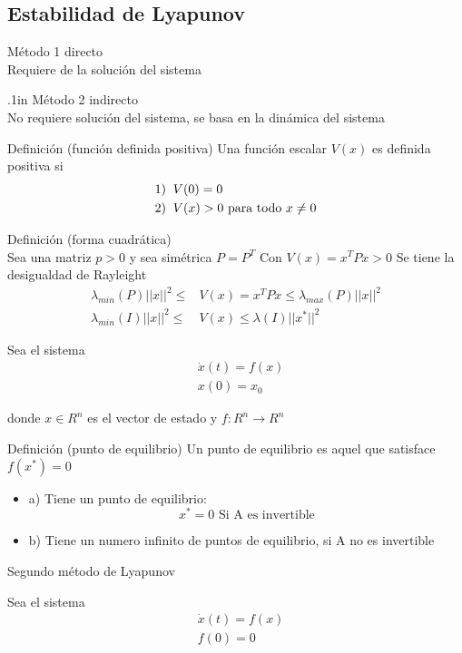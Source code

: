 \subsection{Estabilidad de Lyapunov}

Método 1 directo \\
Requiere de la solución del sistema

\parskip .1in
Método 2 indirecto \\
No requiere solución del sistema, se basa en la dinámica del sistema

Definición (función definida positiva)
Una función escalar \( V(x) \) es definida positiva si
\[
    \begin{split}
        1) & \;\; V(0) = 0 \\
        2) & \;\; V(x) > 0 \text{  para todo \( x \not = 0 \)}
    \end{split}
\]

Definición (forma cuadrática) \\
Sea una matriz \( p > 0 \) y sea simétrica \( P = P^{T} \)
Con \( V(x) = x^{T}Px > 0 \)
Se tiene la desigualdad de Rayleight
\[
    \begin{split}
        \lambda_{min}(P) ||x||^{2} \leq & V(x) = x^{T}Px \leq \lambda_{max} (P) ||x||^{2} \\
        \lambda_{min}(I)||x||^{2} \leq & V(x) \leq \lambda(I) ||x^{*}||^{2}
    \end{split}
\]

Sea el sistema
\[
    \begin{split}
        & \dot{x}(t) = f(x) \\
        & x(0) = x_{0}
    \end{split}
\]

donde \( x \in R^{n} \) es el vector de estado y \( f: R^{n} \to R^{n}\)

Definición  (punto de equilibrio)
Un punto de equilibrio es aquel que satisface \( f(x^{*}) = 0 \)
\begin{itemize}
    \item a) Tiene un punto de equilibrio: 
    \[
        x^{*} = 0 \text{  Si A es invertible}
    \]
    \item b) Tiene un numero infinito de puntos de equilibrio, si A no es invertible
\end{itemize}

Segundo método de Lyapunov

Sea el sistema
\[
    \begin{split}
        & \dot{x}(t) = f(x) \\
        & f(0) = 0
    \end{split}
\]

